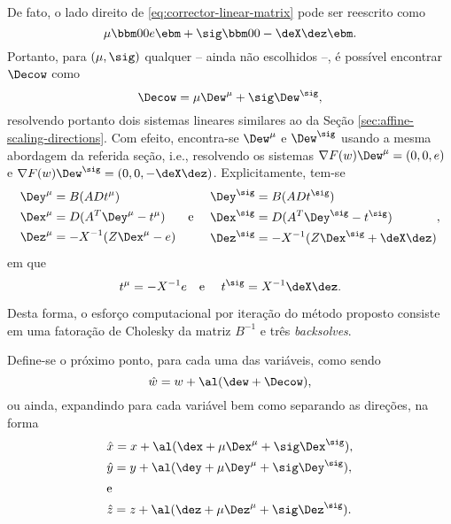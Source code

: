 De fato, o lado direito de  \eqref{eq:corrector-linear-matrix} pode ser
reescrito como
\begin{equation}
\label{eq:corrector-linear-matrix-rhs}
\mu\bbm 0 \\  0 \\ e
\ebm + \sig \bbm 0  \\ 0 \\ - \deX\dez
\ebm.
\end{equation}
Portanto, para $(\mu,\sig)$ qualquer -- ainda não escolhidos --, é possível
encontrar $\Decow$ como
\begin{equation}
\label{eq:Corrector-spllited}
\Decow = \mu \Dew^{\mu} + \sig
\Dew^{\sig},
\end{equation} 
resolvendo portanto dois sistemas lineares similares ao da Seção 
\ref{sec:affine-scaling-directions}. Com efeito, encontra-se 
$\Dew^\mu$ e $\Dew^\sig$  usando a
mesma abordagem da referida seção, i.e., resolvendo
os sistemas $\nabla F(w)\Dew^\mu = (0,0,e)$ e $\nabla F(w)\Dew^\sig = (0,0,-
\deX\dez)$.
Explicitamente, tem-se 
\begin{equation}
\label{eq:De_C} 
\begin{aligned}
& \Dey^{\mu} = B(ADt^\mu )\\
& \Dex^{\mu} = D(A^T\Dey^{\mu} - t^\mu) \\
& \Dez^{\mu} = -X^{-1}(Z\Dex^{\mu} - e)
\end{aligned} \text{\quad e \quad } \begin{aligned}
& \Dey^{\sig} = B(ADt^\sig)\\
& \Dex^{\sig} = D(A^T\Dey^{\sig} - t^\sig) \\
& \Dez^{\sig} = -X^{-1}(Z\Dex^{\sig} + \deX\dez)
\end{aligned}, 
\end{equation}
em que
\[
t^\mu = - X^{-1}e \text{\quad e \quad} t^\sig = X^{-1}\deX\dez.
\]

Desta forma, o esforço computacional por iteração do método proposto consiste
em uma fatoração de Cholesky da matriz $B^{-1}$ e três \emph{backsolves}.
 
 
Define-se o próximo ponto, para cada uma das variáveis, como sendo \[\hat{w} = w
+ \al(\dew + \Decow),\] 
ou ainda, expandindo para cada variável bem como
separando as direções, na forma
\begin{subequations}
\label{eq:next-iterate}
\begin{align}
& \hat{x} = x + \al(\dex + \mu\Dex^\mu + \sig\Dex^\sig ),  \\
& \hat{y} = y + \al(\dey + \mu\Dey^\mu + \sig\Dey^\sig ), \\
\intertext{e}
& \hat{z} = z + \al(\dez + \mu\Dez^\mu + \sig\Dez^\sig ).
\end{align} 
\end{subequations}

